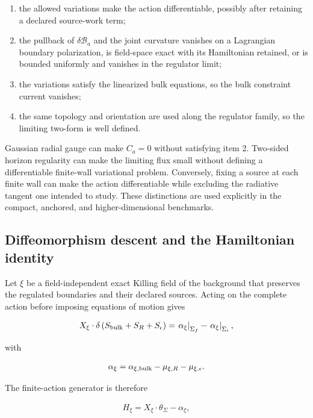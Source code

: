 \begin{enumerate}
\def\labelenumi{\arabic{enumi}.}
\tightlist
\item
  the allowed variations make the action differentiable, possibly after retaining a declared source-work term;
\item
  the pullback of $\delta\mathcal B_a$ and the joint curvature vanishes on a Lagrangian boundary polarization, is field-space exact with its Hamiltonian retained, or is bounded uniformly and vanishes in the regulator limit;
\item
  the variations satisfy the linearized bulk equations, so the bulk constraint current vanishes;
\item
  the same topology and orientation are used along the regulator family, so the limiting two-form is well defined.
\end{enumerate}

Gaussian radial gauge can make $C_a=0$ without satisfying item 2. Two-sided horizon regularity can make the limiting flux small without defining a differentiable finite-wall variational problem. Conversely, fixing a source at each finite wall can make the action differentiable while excluding the radiative tangent one intended to study. These distinctions are used explicitly in the compact, anchored, and higher-dimensional benchmarks.

\subsection{Diffeomorphism descent and the Hamiltonian identity}\label{subsec:diffeomorphism-descent}

Let $\xi$ be a field-independent exact Killing field of the background that preserves the regulated boundaries and their declared sources. Acting on the complete action before imposing equations of motion gives

\begin{align}
X_\xi\mathbin{\cdot}\delta
\left(S_{\rm bulk}+S_R+S_\epsilon\right)
=\left.\alpha_\xi\right|_{\Sigma_f}
-\left.\alpha_\xi\right|_{\Sigma_i},
\end{align}

with

\begin{align}
\alpha_\xi
=\alpha_{\xi,{\rm bulk}}-\mu_{\xi,R}-\mu_{\xi,\epsilon}.
\end{align}

The finite-action generator is therefore

\begin{align}
H_\xi=X_\xi\mathbin{\cdot}\theta_\Sigma-\alpha_\xi,
\end{align}

